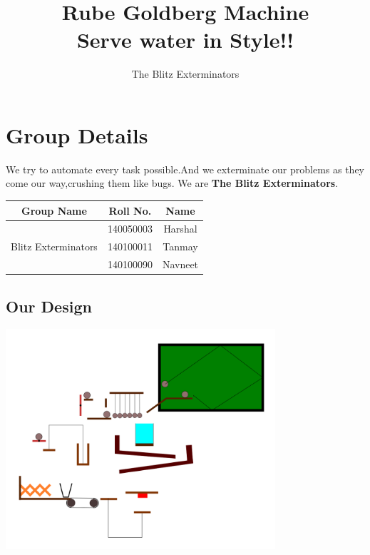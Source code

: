 \documentclass[a4paper,10pt]{article}
\title{Rube Goldberg Machine   \\ Serve water in Style!!}
\author{The Blitz Exterminators}
\begin{document}
\maketitle
\section*{Group Details}
We try to automate every task possible.And we exterminate our problems as they come our way,crushing them like bugs. We are \textbf{The Blitz Exterminators}.
\begin{center}
\begin{tabular}{ |c|c|c|}
\hline
\textbf{Group Name} & \textbf{Roll No.} & \textbf{Name} \\
\hline
\multirow{3}{*}{Blitz Exterminators}& 140050003 & Harshal\\
& 140100011 & Tanmay \\
& 140100090 & Navneet\\
\hline
\end{tabular}
\end{center}
\hfill \break
\begin{center}
\section*{Our Design}
\includegraphics[width=0.75\textwidth]{img}\nocite{inkscape}
\end{center}
\newpage
\end{document}
